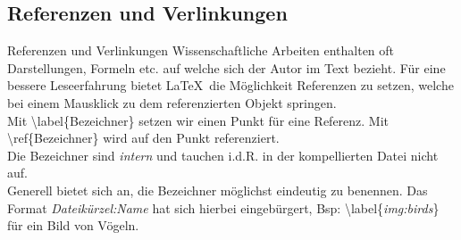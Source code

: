 \subsection{Referenzen und Verlinkungen}
\begin{frame}{Referenzen und Verlinkungen}
    Wissenschaftliche Arbeiten enthalten oft Darstellungen, Formeln etc. auf welche sich der Autor im Text bezieht. F\"ur eine bessere Leseerfahrung bietet \LaTeX~die M\"oglichkeit Referenzen zu setzen, welche bei einem Mausklick zu dem referenzierten Objekt springen.\\\vspace{4mm}
    Mit \cblue\textbackslash label\black\{Bezeichner\} setzen wir einen Punkt f\"ur eine Referenz. Mit \cblue\textbackslash ref\black\{Bezeichner\} wird auf den Punkt referenziert.\\
    Die Bezeichner sind \textit{intern} und tauchen i.d.R. in der kompellierten Datei nicht auf.\\\vspace{4mm}
    Generell bietet sich an, die Bezeichner m\"oglichst eindeutig zu benennen. Das Format \textit{Dateik\"urzel:Name} hat sich hierbei eingeb\"urgert, Bsp: \cblue\textbackslash label\black\{\textit{img:birds}\} f\"ur ein Bild von V\"ogeln.
\end{frame}
